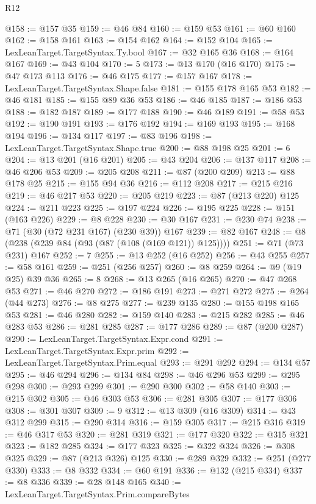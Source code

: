 \begin{lexlean}{R12}
\begin{coremodule}
@158 := @157 @35
@159 := @46 @84
@160 := @159 @53
@161 := @60 @160
@162 := @158 @161
@163 := @154 @162
@164 := @152 @104
@165 := LexLeanTarget.TargetSyntax.Ty.bool
@167 := @32 @165 @36
@168 := @164 @167
@169 := @43 @104
@170 := 5
@173 := @13 @170 (@16 @170)
@175 := @47 @173 @113
@176 := @46 @175
@177 := @157 @167
@178 := LexLeanTarget.TargetSyntax.Shape.false
@181 := @155 @178 @165 @53
@182 := @46 @181
@185 := @155 @89 @36 @53
@186 := @46 @185
@187 := @186 @53
@188 := @182 @187
@189 := @177 @188
@190 := @46 @189
@191 := @58 @53
@192 := @190 @191
@193 := @176 @192
@194 := @169 @193
@195 := @168 @194
@196 := @134 @117
@197 := @83 @196
@198 := LexLeanTarget.TargetSyntax.Shape.true
@200 := @88 @198 @25
@201 := 6
@204 := @13 @201 (@16 @201)
@205 := @43 @204
@206 := @137 @117
@208 := @46 @206 @53
@209 := @205 @208
@211 := @87 (@200 @209)
@213 := @88 @178 @25
@215 := @155 @94 @36
@216 := @112 @208
@217 := @215 @216
@219 := @46 @217 @53
@220 := @205 @219
@223 := @87 (@213 @220) @125
@224 := @211 @223
@225 := @197 @224
@226 := @195 @225
@228 := @151 (@163 @226)
@229 := @8 @228
@230 := @30 @167
@231 := @230 @74
@238 := @71 (@30 (@72 @231 @167) (@230 @39)) @167
@239 := @82 @167
@248 := @8 (@238 (@239 @84 (@93 (@87 (@108 (@169 @121)) @125))))
@251 := @71 (@73 @231) @167
@252 := 7
@255 := @13 @252 (@16 @252)
@256 := @43 @255
@257 := @58 @161
@259 := @251 (@256 @257)
@260 := @8 @259
@264 := @9 (@19 @25) @39 @36
@265 := 8
@268 := @13 @265 (@16 @265)
@270 := @47 @268 @53
@271 := @46 @270
@272 := @186 @191
@273 := @271 @272
@275 := @264 (@44 @273)
@276 := @8 @275
@277 := @239 @135
@280 := @155 @198 @165 @53
@281 := @46 @280
@282 := @159 @140
@283 := @215 @282
@285 := @46 @283 @53
@286 := @281 @285
@287 := @177 @286
@289 := @87 (@200 @287)
@290 := LexLeanTarget.TargetSyntax.Expr.cond
@291 := LexLeanTarget.TargetSyntax.Expr.prim
@292 := LexLeanTarget.TargetSyntax.Prim.equal
@293 := @291 @292
@294 := @134 @57
@295 := @46 @294
@296 := @134 @84
@298 := @46 @296 @53
@299 := @295 @298
@300 := @293 @299
@301 := @290 @300
@302 := @58 @140
@303 := @215 @302
@305 := @46 @303 @53
@306 := @281 @305
@307 := @177 @306
@308 := @301 @307
@309 := 9
@312 := @13 @309 (@16 @309)
@314 := @43 @312 @299
@315 := @290 @314
@316 := @159 @305
@317 := @215 @316
@319 := @46 @317 @53
@320 := @281 @319
@321 := @177 @320
@322 := @315 @321
@323 := @182 @285
@324 := @177 @323
@325 := @322 @324
@326 := @308 @325
@329 := @87 (@213 @326) @125
@330 := @289 @329
@332 := @251 (@277 @330)
@333 := @8 @332
@334 := @60 @191
@336 := @132 (@215 @334)
@337 := @8 @336
@339 := @28 @148 @165
@340 := LexLeanTarget.TargetSyntax.Prim.compareBytes

\end{coremodule}
\end{lexlean}
